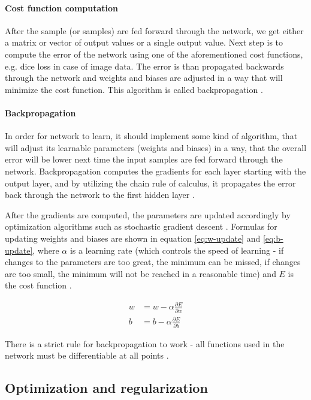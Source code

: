 \paragraph{Cost function computation}
After the sample (or samples) are fed forward through the network, we get either a matrix or vector of output values or a single output value. Next step is to compute the error of the network using one of the aforementioned cost functions, e.g. dice loss in case of image data. The error is than propagated backwards through the network and weights and biases are adjusted in a way that will minimize the cost function. This algorithm is called backpropagation \cite{Goodfellow2016}.

\paragraph{Backpropagation}
In order for network to learn, it should implement some kind of algorithm, that will adjust its learnable parameters (weights and biases) in a way, that the overall error will be lower next time the input samples are fed forward through the network. Backpropagation computes the gradients for each layer starting with the output layer, and by utilizing the chain rule of calculus, it propagates the error back through the network to the first hidden layer \cite{LeCun2015}.

After the gradients are computed, the parameters are updated accordingly by optimization algorithms such as stochastic gradient descent \cite{Santosh2022-2}. Formulas for updating weights and biases are shown in equation \ref{eq:w-update} and \ref{eq:b-update}, where $\alpha$ is a learning rate (which controls the speed of learning - if changes to the parameters are too great, the minimum can be missed, if changes are too small, the minimum will not be reached in a reasonable time) and $E$ is the cost function \cite{Goodfellow2016, LeCun2015}.

\begin{align}
\label{eq:w-update}
w &= w - \alpha \frac{\partial E}{\partial w} \\
\label{eq:b-update}
b &=  b - \alpha \frac{\partial E}{\partial b}
\end{align}

There is a strict rule for backpropagation to work - all functions used in the network must be differentiable at all points \cite{Rumelhart1986, Santosh2022-2}.

\subsection{Optimization and regularization}

